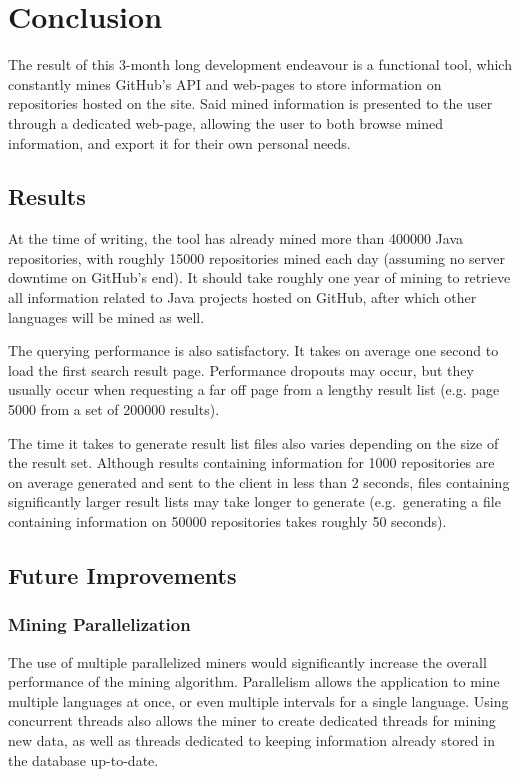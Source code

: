 \chapter{Conclusion}\label{ch:6}

The result of this 3-month long development endeavour is a functional tool, which constantly mines GitHub's API and web-pages to store information on repositories hosted on the site.
Said mined information is presented to the user through a dedicated web-page, allowing the user to both browse mined information, and export it for their own personal needs.

\section{Results}

At the time of writing, the tool has already mined more than 400000 Java repositories, with roughly 15000 repositories mined each day (assuming no server downtime on GitHub's end).
It should take roughly one year of mining to retrieve all information related to Java projects hosted on GitHub, after which other languages will be mined as well.

The querying performance is also satisfactory.
It takes on average one second to load the first search result page.
Performance dropouts may occur, but they usually occur when requesting a far off page from a lengthy result list (e.g. page 5000 from a set of 200000 results).

The time it takes to generate result list files also varies depending on the size of the result set.
Although results containing information for 1000 repositories are on average generated and sent to the client in less than 2 seconds, files containing significantly larger result lists may take longer to generate (e.g.\ generating a file containing information on 50000 repositories takes roughly 50 seconds).

\section{Future Improvements}

\subsection{Mining Parallelization}

The use of multiple parallelized miners would significantly increase the overall performance of the mining algorithm.
Parallelism allows the application to mine multiple languages at once, or even multiple intervals for a single language.
Using concurrent threads also allows the miner to create dedicated threads for mining new data, as well as threads dedicated to keeping information already stored in the database up-to-date.

